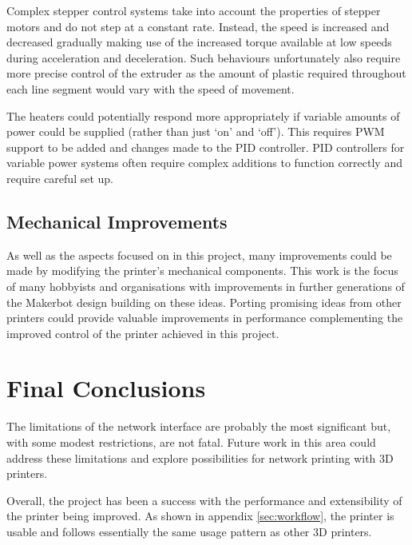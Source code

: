 			Complex stepper control systems take into account the properties of
			stepper motors and do not step at a constant rate.  Instead, the speed is
			increased and decreased gradually making use of the increased torque
			available at low speeds during acceleration and deceleration. Such
			behaviours unfortunately also require more precise control of the extruder
			as the amount of plastic required throughout each line segment would vary
			with the speed of movement.
			
			The heaters could potentially respond more appropriately if variable
			amounts of power could be supplied (rather than just `on' and `off'). This
			requires PWM support to be added and changes made to the PID controller.
			PID controllers for variable power systems often require complex additions
			to function correctly and require careful set up.
			
		\subsection{Mechanical Improvements}
			
			As well as the aspects focused on in this project, many improvements could
			be made by modifying the printer's mechanical components. This work is the
			focus of many hobbyists and organisations with improvements in further
			generations of the Makerbot design building on these ideas. Porting
			promising ideas from other printers could provide valuable improvements in
			performance complementing the improved control of the printer achieved in
			this project.
	
	\section{Final Conclusions}
		
		The limitations of the network interface are probably the most significant
		but, with some modest restrictions, are not fatal. Future work in this area
		could address these limitations and explore possibilities for network
		printing with 3D printers.
		
		Overall, the project has been a success with the performance and
		extensibility of the printer being improved. As shown in appendix
		\ref{sec:workflow}, the printer is usable and follows essentially the same
		usage pattern as other 3D printers.
